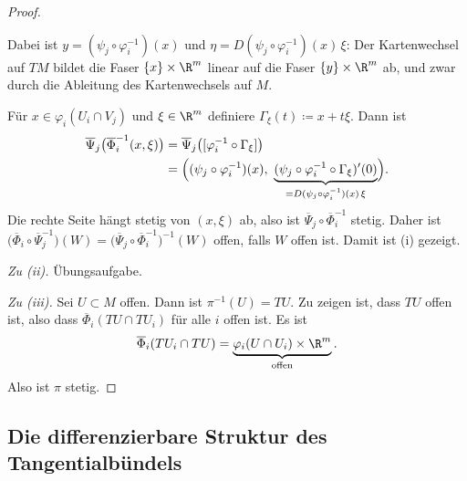 \documentclass[11pt]{article}
\begin{document}
\begin{proof}
\begin{ergaenzung}
\begin{center}
  \end{center}
  Dabei ist $y = (\psi_j \circ \varphi_i^{-1})(x)$ und $\eta = D(\psi_j \circ \varphi_i^{-1})(x)\, \xi$: Der Kartenwechsel auf $TM$ bildet die Faser $\{x\} \times \R^m$ linear auf die Faser $\{y\} \times \R^m$ ab, und zwar durch die Ableitung des Kartenwechsels auf $M$.
  \end{ergaenzung}
  Für $x \in \varphi_i(U_i \cap V_j)$ und $\xi \in \R^m$ definiere $\Gamma_\xi(t) \coloneqq x + t\xi$. Dann ist
  \begin{align*}
    \overline{\Psi}_j\bigl(\overline{\Phi}_i^{-1}(x, \xi)\bigr) &= \overline{\Psi}_j\bigl([\varphi_i^{-1} \circ \Gamma_\xi]\bigr) \\
    &= \Bigl( (\psi_j \circ \varphi_i^{-1})(x),\ \underbrace{(\psi_j \circ \varphi_i^{-1} \circ \Gamma_\xi)'(0)}_{= D(\psi_j \circ \varphi_i^{-1})(x)\, \xi} \Bigr).
  \end{align*}
Die rechte Seite hängt stetig von $(x, \xi)$ ab, also ist $\overline{\Psi}_j \circ \overline{\Phi}_i^{-1}$ stetig. Daher ist $\bigl(\overline{\Phi}_i \circ \overline{\Psi}_j^{-1}\bigr)(W) = \bigl(\overline{\Psi}_j \circ \overline{\Phi}_i^{-1}\bigr)^{-1}(W)$ offen, falls $W$ offen ist. Damit ist (i) gezeigt.


  \textit{Zu (ii).} Übungsaufgabe.

  \textit{Zu (iii).} Sei $U \subset M$ offen. Dann ist $\pi^{-1}(U) = TU$. Zu zeigen ist, dass $TU$ offen ist, also dass $\overline{\Phi}_i(TU \cap TU_i)$ für alle $i$ offen ist. Es ist
  \[ \overline{\Phi}_i(TU_i \cap TU) = \underbrace{\varphi_i(U \cap U_i) \times \R^m}_{\text{offen}}. \]
  Also ist $\pi$ stetig.
\end{proof}


\subsection{Die differenzierbare Struktur des Tangentialbündels}
\end{document}
